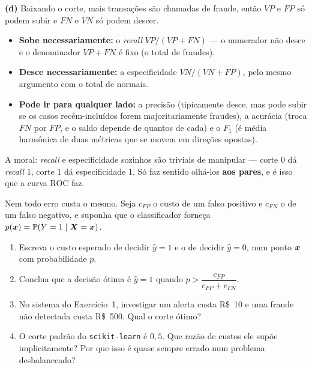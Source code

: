 \documentclass[11pt,a4paper]{article}
\begin{document}
\begin{solucao}
\smallskip
\textbf{(d)} Baixando o corte, mais transações são chamadas de fraude, então
$VP$ e $FP$ só podem subir e $FN$ e $VN$ só podem descer.
\begin{itemize}[leftmargin=1.4cm]
  \item \textbf{Sobe necessariamente:} o \emph{recall} $VP/(VP+FN)$ --- o
        numerador não desce e o denominador $VP+FN$ é fixo (o total de fraudes).
  \item \textbf{Desce necessariamente:} a especificidade $VN/(VN+FP)$, pelo mesmo
        argumento com o total de normais.
  \item \textbf{Pode ir para qualquer lado:} a precisão (tipicamente desce, mas
        pode subir se os casos recém-incluídos forem majoritariamente fraudes),
        a acurácia (troca $FN$ por $FP$, e o saldo depende de quantos de cada) e
        o $F_1$ (é média harmônica de duas métricas que se movem em direções
        opostas).
\end{itemize}
A moral: \emph{recall} e especificidade sozinhos são triviais de manipular ---
corte $0$ dá \emph{recall} $1$, corte $1$ dá especificidade $1$. Só faz sentido
olhá-los \textbf{aos pares}, e é isso que a curva ROC faz.
\end{solucao}

\begin{exercicio}
Nem todo erro custa o mesmo. Seja $c_{FP}$ o custo de um falso positivo e
$c_{FN}$ o de um falso negativo, e suponha que o classificador forneça
$p(\bm{x}) = \mathbb{P}(Y=1\mid \bm{X}=\bm{x})$.
\begin{enumerate}[label=(\alph*),leftmargin=1.1cm]
  \item Escreva o custo esperado de decidir $\widehat y=1$ e o de decidir
        $\widehat y=0$, num ponto $\bm{x}$ com probabilidade $p$.
  \item Conclua que a decisão ótima é $\widehat y=1$ quando
        $p > \dfrac{c_{FP}}{c_{FP}+c_{FN}}$.
  \item No sistema do Exercício~1, investigar um alerta custa R\$~10 e uma fraude
        não detectada custa R\$~500. Qual o corte ótimo?
  \item O corte padrão do \texttt{scikit-learn} é $0{,}5$. Que razão de custos
        ele supõe implicitamente? Por que isso é quase sempre errado num problema
        desbalanceado?
\end{enumerate}
\end{exercicio}
\end{document}
